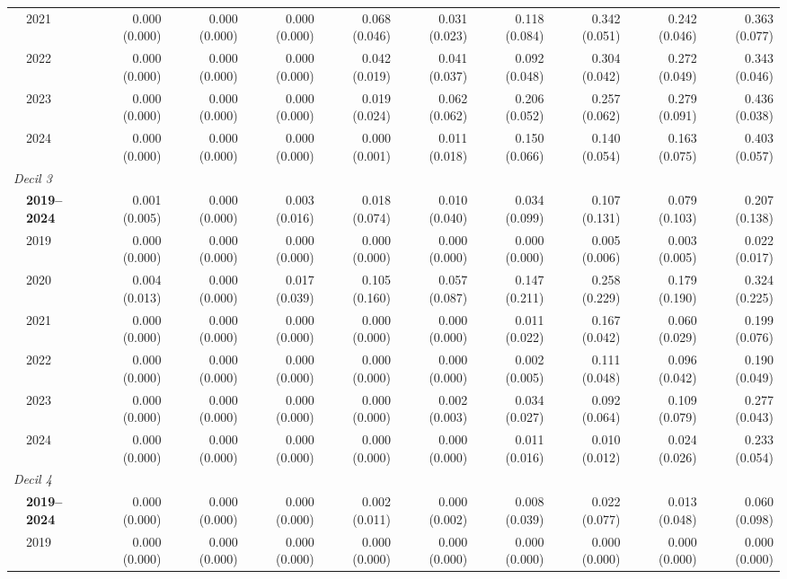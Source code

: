 \begin{table}[htbp]
\begin{tabular}{llrrrrrrrrr}
 & 2021 & 0.000 (0.000) & 0.000 (0.000) & 0.000 (0.000) & 0.068 (0.046) & 0.031 (0.023) & 0.118 (0.084) & 0.342 (0.051) & 0.242 (0.046) & 0.363 (0.077) \\
 & 2022 & 0.000 (0.000) & 0.000 (0.000) & 0.000 (0.000) & 0.042 (0.019) & 0.041 (0.037) & 0.092 (0.048) & 0.304 (0.042) & 0.272 (0.049) & 0.343 (0.046) \\
 & 2023 & 0.000 (0.000) & 0.000 (0.000) & 0.000 (0.000) & 0.019 (0.024) & 0.062 (0.062) & 0.206 (0.052) & 0.257 (0.062) & 0.279 (0.091) & 0.436 (0.038) \\
 & 2024 & 0.000 (0.000) & 0.000 (0.000) & 0.000 (0.000) & 0.000 (0.001) & 0.011 (0.018) & 0.150 (0.066) & 0.140 (0.054) & 0.163 (0.075) & 0.403 (0.057) \\
\midrule
\multicolumn{11}{l}{\textit{Decil 3}} \\
 & \textbf{2019–2024} & 0.001 (0.005) & 0.000 (0.000) & 0.003 (0.016) & 0.018 (0.074) & 0.010 (0.040) & 0.034 (0.099) & 0.107 (0.131) & 0.079 (0.103) & 0.207 (0.138) \\
 & 2019 & 0.000 (0.000) & 0.000 (0.000) & 0.000 (0.000) & 0.000 (0.000) & 0.000 (0.000) & 0.000 (0.000) & 0.005 (0.006) & 0.003 (0.005) & 0.022 (0.017) \\
 & 2020 & 0.004 (0.013) & 0.000 (0.000) & 0.017 (0.039) & 0.105 (0.160) & 0.057 (0.087) & 0.147 (0.211) & 0.258 (0.229) & 0.179 (0.190) & 0.324 (0.225) \\
 & 2021 & 0.000 (0.000) & 0.000 (0.000) & 0.000 (0.000) & 0.000 (0.000) & 0.000 (0.000) & 0.011 (0.022) & 0.167 (0.042) & 0.060 (0.029) & 0.199 (0.076) \\
 & 2022 & 0.000 (0.000) & 0.000 (0.000) & 0.000 (0.000) & 0.000 (0.000) & 0.000 (0.000) & 0.002 (0.005) & 0.111 (0.048) & 0.096 (0.042) & 0.190 (0.049) \\
 & 2023 & 0.000 (0.000) & 0.000 (0.000) & 0.000 (0.000) & 0.000 (0.000) & 0.002 (0.003) & 0.034 (0.027) & 0.092 (0.064) & 0.109 (0.079) & 0.277 (0.043) \\
 & 2024 & 0.000 (0.000) & 0.000 (0.000) & 0.000 (0.000) & 0.000 (0.000) & 0.000 (0.000) & 0.011 (0.016) & 0.010 (0.012) & 0.024 (0.026) & 0.233 (0.054) \\
\midrule
\multicolumn{11}{l}{\textit{Decil 4}} \\
 & \textbf{2019–2024} & 0.000 (0.000) & 0.000 (0.000) & 0.000 (0.000) & 0.002 (0.011) & 0.000 (0.002) & 0.008 (0.039) & 0.022 (0.077) & 0.013 (0.048) & 0.060 (0.098) \\
 & 2019 & 0.000 (0.000) & 0.000 (0.000) & 0.000 (0.000) & 0.000 (0.000) & 0.000 (0.000) & 0.000 (0.000) & 0.000 (0.000) & 0.000 (0.000) & 0.000 (0.000) \\

\end{tabular}
\end{table}
